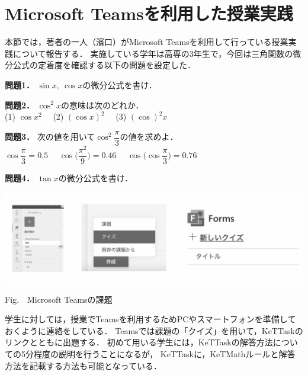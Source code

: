 \documentclass[a4j,12pt]{ujarticle}
\begin{document}
\newpage%

\section{Microsoft Teamsを利用した授業実践}

本節では，著者の一人（濱口）がMicrosoft Teamsを利用して行っている授業実践について報告する．
実施している学年は高専の3年生で，今回は三角関数の微分公式の定着度を確認する以下の問題を設定した．\vspace*{2mm}

{\bf 問題1．}
$\sin x, \ \cos x$の微分公式を書け．\vspace*{3mm}

{\bf 問題2．}
$\cos^2\! x$の意味は次のどれか．　\vspace*{1mm}\\
\hspace*{3zw}%
(1) $\cos x^2$　
(2) $(\cos x)^2$　
(3) $(\cos)^2x$\vspace*{3mm}

{\bf 問題3．}
次の値を用いて$\cos^2\!\dfrac{\pi}{3}$の値を求めよ．\\
\hspace*{3zw}%
$\cos \dfrac{\pi}{3}\!=\!0.5$　
$\cos \bigl(\dfrac{\pi^2}{9}\bigr)\!=\!0.46$　
$\cos \bigl(\cos\dfrac{\pi}{3}\bigr)\!=\!0.76$\vspace*{3mm}

{\bf 問題4．}
$\tan x$の微分公式を書け．

\vspace{-2mm}

\begin{center}
\includegraphics[bb=0.00 0.00 820.32 249.12,width=140mm]{fig/teams1bw.pdf}
\vspace{-2mm}

\addtocounter{figure}{1}Fig.\thefigure\ \ Microsoft Teamsの課題
\end{center}

\vspace{-2mm}

学生に対しては，授業でTeamsを利用するためPCやスマートフォンを準備しておくように連絡をしている．
Teamsでは課題の「クイズ」を用いて，KeTTaskのリンクとともに出題する．
初めて用いる学生には，KeTTaskの解答方法についての5分程度の説明を行うことになるが，
KeTTaskに，KeTMathルールと解答方法を記載する方法も可能となっている．
\end{document}
